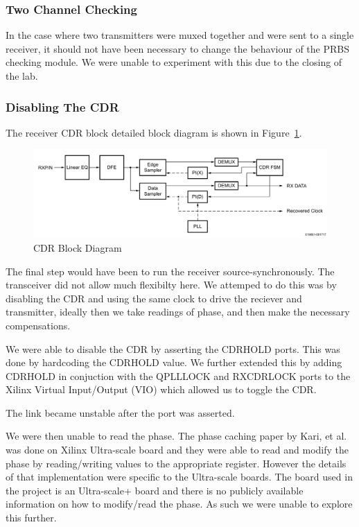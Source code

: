 \subsubsection{Two Channel Checking}%
\label{ssub:two_channel_checking}
In the case where two transmitters were muxed together and were sent to a
single receiver, it should not have been necessary to change the behaviour of
the PRBS checking module.
We were unable to experiment with this due to the closing of the lab.

\subsubsection{Disabling The CDR}%
\label{ssub:disabling_the_cdr}
The receiver CDR block detailed block diagram is shown in
Figure~\ref{fig:cdr_detail}.

\begin{figure}[ht]
    \centering
    \hspace*{-1cm}\includegraphics[width=1.2\linewidth]{img/cdr_detail}
    \caption{CDR Block Diagram}%
    \label{fig:cdr_detail}
\end{figure}

The final step would have been to run the receiver source-synchronously.  The
transceiver did not allow much flexibilty here. We attemped to do this was by
disabling the CDR and using the same clock to drive the reciever and
transmitter, ideally then we take readings of phase, and then make the
necessary compensations.
 
We were able to disable the CDR by asserting the CDRHOLD ports. This was done
by hardcoding the CDRHOLD value. We further extended this by adding CDRHOLD
in conjuction with the QPLLLOCK and RXCDRLOCK ports to the Xilinx Virtual
Input/Output (VIO) which allowed us to toggle the CDR.

The link became unstable after the port was asserted.  

We were then unable to read the phase. The phase caching paper by Kari, et al.
\cite{kari_phase} was done on Xilinx Ultra-scale board and they were able to
read and modify the phase by reading/writing values to the appropriate register.
However the details of that implementation were specific to the Ultra-scale
boards. The board used in the project is an Ultra-scale+ board and there is no
publicly available information on how to modify/read the phase. 
As such we were unable to explore this further.

